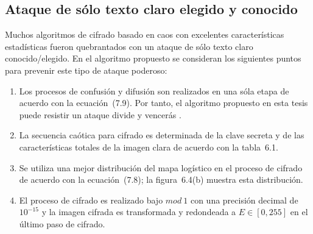 \begin{table}[!htbp] %
	\center
	\caption{Coeficiente de correlación horizontal.}
\end{table} 

\subsection{Ataque de sólo texto claro elegido y conocido}
Muchos algoritmos de cifrado basado en caos con excelentes características estadísticas fueron quebrantados con un ataque de sólo texto claro conocido/elegido. En el algoritmo propuesto se consideran los siguientes puntos para prevenir este tipo de ataque poderoso:
\begin{enumerate}
   \item Los procesos de confusión y difusión son realizados en una sóla etapa de acuerdo con la ecuación~(7.9). Por tanto, el algoritmo propuesto en esta tesis puede resistir un ataque divide y vencerás \cite{LEtAl_2011}. 
   \item La secuencia caótica para cifrado es determinada de la clave secreta y de las características totales de la imagen clara de acuerdo con la tabla~6.1.
   \item Se utiliza una mejor distribución del mapa logístico en el proceso de cifrado de acuerdo con la ecuación~(7.8); la figura~6.4(b) muestra esta distribución.
   \item El proceso de cifrado es realizado bajo $mod~1$ con una precisión decimal de $10^{-15}$ y la imagen cifrada es transformada y redondeada a $E\in[0,255]$ en el último paso de cifrado. \\
\end{enumerate}   

